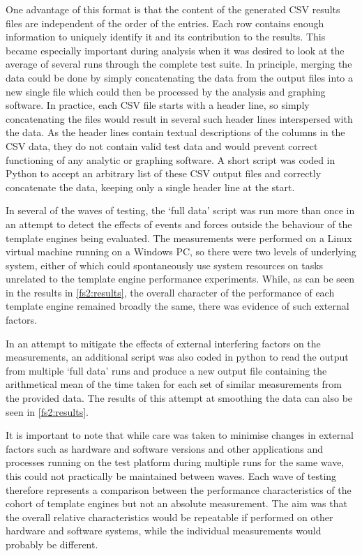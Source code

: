 One advantage of this format is that the content of the generated CSV results files are independent of the order of the entries. Each row contains enough information to uniquely identify it and its contribution to the results. This became especially important during analysis when it was desired to look at the average of several runs through the complete test suite. In principle, merging the data could be done by simply concatenating the data from the output files into a new single file which could then be processed by the analysis and graphing software. In practice, each CSV file starts with a header line, so simply concatenating the files would result in several such header lines interspersed with the data. As the header lines contain textual descriptions of the columns in the CSV data, they do not contain valid test data and would prevent correct functioning of any analytic or graphing software. A short script was coded in Python to accept an arbitrary list of these CSV output files and correctly concatenate the data, keeping only a single header line at the start.

In several of the waves of testing, the `full data' script was run more than once in an attempt to detect the effects of events and forces outside the behaviour of the template engines being evaluated. The measurements were performed on a Linux virtual machine running on a Windows PC, so there were two levels of underlying system, either of which could spontaneously use system resources on tasks unrelated to the template engine performance experiments. While, as can be seen in the results in \autoref{fs2:results}, the overall character of the performance of each template engine remained broadly the same, there was evidence of such external factors.

In an attempt to mitigate the effects of external interfering factors on the measurements, an additional script was also coded in python to read the output from multiple `full data' runs and produce a new output file containing the arithmetical mean of the time taken for each set of similar measurements from the provided data. The results of this attempt at smoothing the data can also be seen in \autoref{fs2:results}.

It is important to note that while care was taken to minimise changes in external factors such as hardware and software versions and other applications and processes running on the test platform during multiple runs for the same wave, this could not practically be maintained between waves. Each wave of testing therefore represents a comparison between the performance characteristics of the cohort of template engines but not an absolute measurement. The aim was that the overall relative characteristics would be repeatable if performed on other hardware and software systems, while the individual measurements would probably be different.

